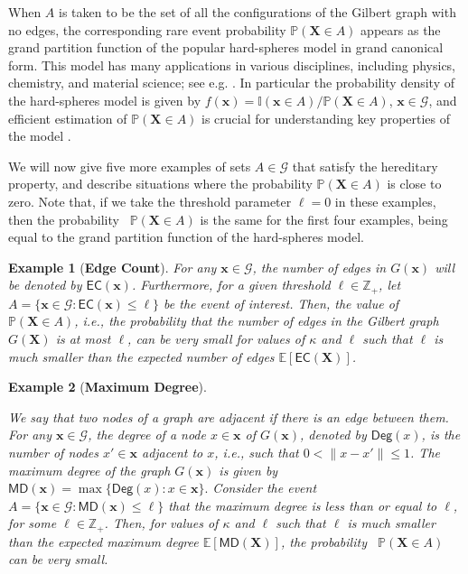 \documentclass[pdflatex, sn-mathphys-ay]{sn-jnl}%
\newcommand{\intg}{\mathbb{Z}}
\newcommand{\ind}{\mathbb{I}}
\newcommand{\mc}{\mathcal}
\renewcommand{\v}[1]{\boldsymbol{#1}}
\newcommand{\pp}{\mathbb{P}}
\newcommand{\ee}{\mathbb{E}}
\newcommand{\mx}{\v{x}}
\newcommand{\mX}{\v{X}}
\newcommand{\scG}{\mathscr{G}}
\newcommand{\lt}{\left}
\newcommand{\rt}{\right}
\newcommand{\maxd}{\mathsf{MD}}
\newcommand{\ec}{\mathsf{EC}}
\theoremstyle{thmstyleone}%
\theoremstyle{thmstyletwo}%
\newtheorem{example}{Example}%
\theoremstyle{thmstylethree}%
\begin{document}
When $A$ is taken to be the set of all the configurations of the Gilbert graph with no edges, the corresponding rare event probability $\pp(\mX \in A)$ appears as the grand partition function of the popular hard-spheres model in grand canonical form. This model has many applications in various disciplines, including  physics, chemistry, and material science; see e.g.  
\cite{krauth2006statistical, MJM17}. In particular the probability density of the hard-spheres model is given by $
f(\mx) = \ind(\mx \in A)/\pp(\mX \in A)$,  $\mx \in \scG$, and efficient estimation of $\pp(\mX \in A)$ is crucial for understanding key properties of the model \citep{doge2004grand}.


We will now give five more examples of sets $A\in\mc G$ that satisfy the hereditary property, and describe situations where the probability  $\pp(\mX \in A)$ is close to zero. 
Note that, if we take the threshold parameter $\ell = 0$ in these examples, then  the  probability~ $\pp(\mX \in A)$ is the same for  the first four examples, 
being equal to the grand partition function of the hard-spheres model.

\begin{example} [\bf Edge Count]
\label{expl:ec}
\normalfont
For any $\mx \in \scG$,  the number of edges in $G(\mx)$  will be denoted by $\ec(\mx)$. Furthermore, for a given threshold $\ell \in \intg_+$, let 
$A = \{\mx \in \scG : \ec(\mx) \leq \ell \}$ be the event of interest. 
Then, the  value of ~$ \pp\lt(\mX \in A\rt)$, i.e., the probability that the number of edges in the Gilbert graph $G(\mX)$ is at most $\ell$, can be very small for values of $\kappa$ and $\ell$ such that $\ell$ is much smaller 
than the expected number of edges ${\ee\lt[ \ec(\mX)\rt]}$.
\end{example}

\begin{example} [\bf Maximum Degree]
\label{expl:deg} 
\normalfont

We say that two nodes of a graph are adjacent if there is an edge between them.
For any $\mx \in \scG$, the  degree of a node $x \in \mx$ of $G(\mx)$, denoted by $\mathsf{Deg}(x)$, is the number of nodes  $x' \in \mx$  adjacent to $x$, i.e., such that $0<\|x-x'\|\le 1$. 
The maximum degree of the graph $G(\mx)$ is given by
$
\maxd\lt( \mx\rt) = \max\{\mathsf{Deg}(x) : x \in \mx\}.
$
Consider the event
$A = \{ \mx \in \scG : \maxd\lt( \mx\rt) \leq \ell\}$ that the maximum degree is less than or equal to $\ell$, for some  $\ell\in\intg_+$.  
Then, for values of $\kappa$ and $\ell$ such that $\ell$ is much smaller than the expected maximum degree $\ee[\maxd \lt( \mX\rt)]$, the   probability ~$\pp\lt(\mX \in A\rt)$ can be very small.
\end{example}
\end{document}
